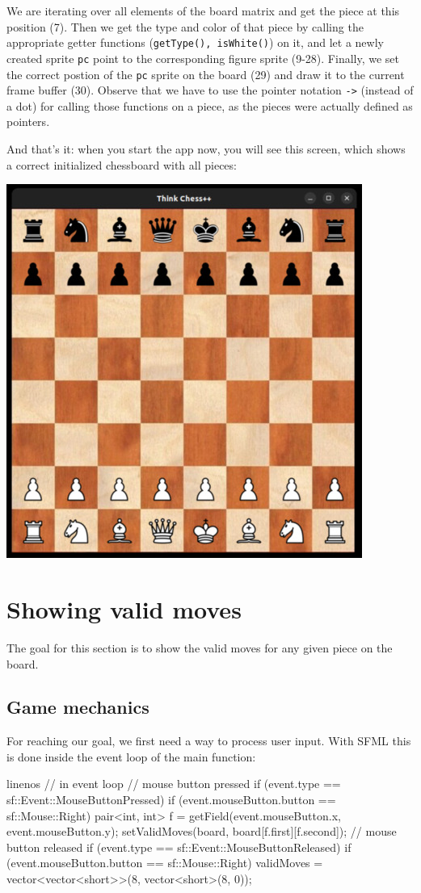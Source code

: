 We are iterating over all elements of the board matrix and get the piece at this position (7).
Then we get the type and color of that piece by calling the appropriate getter functions
(\texttt{getType(), isWhite()}) on it, and let a newly created sprite \texttt{pc}
point to the corresponding figure sprite (9-28).
Finally, we set the correct postion of the \texttt{pc} sprite on the board (29) and draw it
to the current frame buffer (30).
Observe that we have to use the pointer notation \texttt{->} (instead of a dot) for calling
those functions on a piece, as the pieces were actually defined as pointers.

And that's it: when you start the app now, you will see this screen, which shows a
correct initialized chessboard with all pieces:

\begin{center}
\includegraphics[width=.5\linewidth]{../img/boardWithPieces.jpg}
\end{center}


\section{Showing valid moves}
The goal for this section is to show the valid moves for any given piece on the board.
\subsection{Game mechanics}

For reaching our goal, we first need a way to process user input.
With SFML this is done inside the event loop of the main function:

\begin{cpp*}{linenos}
      // in event loop
      // mouse button pressed
      if (event.type == sf::Event::MouseButtonPressed) {
        if (event.mouseButton.button == sf::Mouse::Right) {
          pair<int, int> f =
            getField(event.mouseButton.x, event.mouseButton.y);
          setValidMoves(board, board[f.first][f.second]);
        }
      }
      // mouse button released
      if (event.type == sf::Event::MouseButtonReleased) {
        if (event.mouseButton.button == sf::Mouse::Right) {
          validMoves =
            vector<vector<short>>(8, vector<short>(8, 0));
        }
      }
\end{cpp*}

